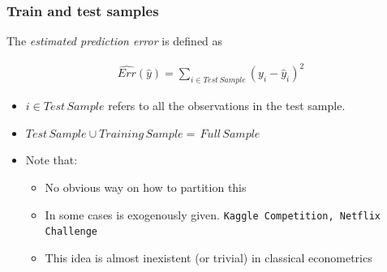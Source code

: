 \documentclass[
  shownotes,
  xcolor={svgnames},
  hyperref={colorlinks,citecolor=DarkBlue,linkcolor=DarkRed,urlcolor=DarkBlue}
  , aspectratio=169]{beamer}
\begin{document}
\begin{frame}
\frametitle{Train and test samples}


The \emph{estimated prediction error} is defined as

\begin{align}
\hat{Err}(\hat y) = \sum_{i \in Test\,Sample} \left(y_i - \hat y_i \right)^2
\end{align}

\begin{itemize}
  \item $i \in Test\,Sample$ refers to all the observations in the test sample. 
  \item $Test\,Sample \cup Training\,Sample = \,Full\,Sample$
  \bigskip
  \item Note that:
  \begin{itemize}
    \item No obvious way on how to partition this
    \item In some cases is exogenously given. \texttt{Kaggle Competition, Netflix Challenge}
    \item This idea is almost inexistent (or trivial) in classical econometrics
  \end{itemize}  

\end{itemize}




\end{frame}
\end{document}
